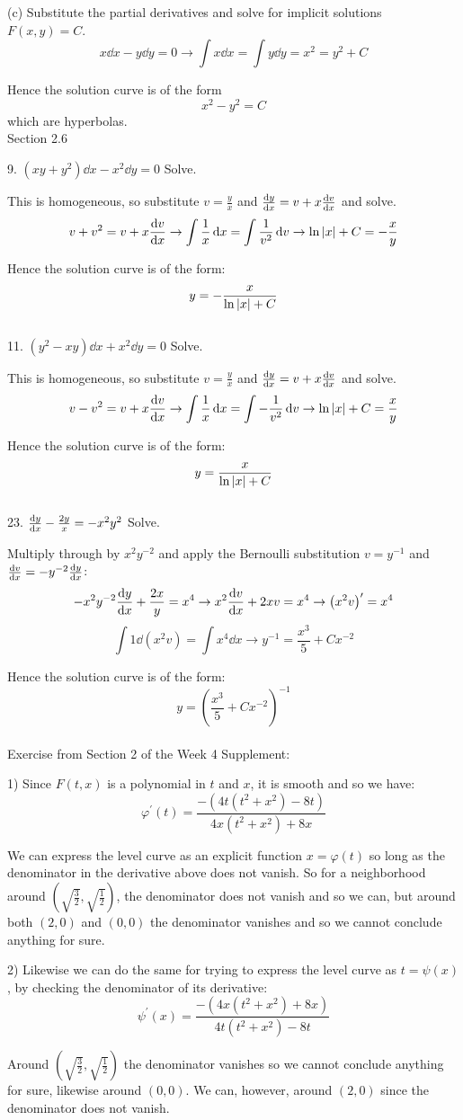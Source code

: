 \documentclass[11pt]{article}
\newcommand{\br}[1]{\left(#1\right)}
\begin{document}
(c) Substitute the partial derivatives and solve for implicit solutions $F(x,y) = C$.
$$x\dd{x} - y\dd{y} = 0 \to \int x\dd{x} = \int y\dd{y} = x^2 = y^2 + C$$

Hence the solution curve is of the form
$$x^2 - y^2 = C$$
which are hyperbolas. \\

Section 2.6

9. $\br{xy + y^2}\dd{x} - x^2\dd{y} = 0$ Solve.

This is homogeneous, so substitute $v = \frac{y}{x}$ and $\dv{y}{x} = v + x\dv{v}{x}$ and solve.
$$v + v^2  = v + x\dv{v}{x} \to \int \frac{1}{x}\dd{x} = \int \frac{1}{v^2}\dd{v} \to \ln\abs{x} + C = -\frac{x}{y}$$

Hence the solution curve is of the form:
$$y = -\frac{x}{\ln\abs{x} + C}$$ \\

11. $\br{y^2-xy}\dd{x} + x^2\dd{y} = 0$ Solve.

This is homogeneous, so substitute $v = \frac{y}{x}$ and $\dv{y}{x} = v + x\dv{v}{x}$ and solve.
$$v - v^2  = v + x\dv{v}{x} \to \int \frac{1}{x}\dd{x} = \int -\frac{1}{v^2}\dd{v} \to \ln\abs{x} + C = \frac{x}{y}$$

Hence the solution curve is of the form:
$$y = \frac{x}{\ln\abs{x} + C}$$ \\

23. $\dv{y}{x} - \frac{2y}{x} = -x^2y^2$ Solve.

Multiply through by $x^2y^{-2}$ and apply the Bernoulli substitution $v = y^{-1}$ and $\dv{v}{x} = -y^{-2}\dv{y}{x}$:
$$-x^2y^{-2}\dv{y}{x} + \frac{2x}{y} = x^4 \to x^2\dv{v}{x} + 2xv = x^4 \to \br{x^2v}^{\prime} = x^4$$
$$\int 1 \dd{\br{x^2v}} = \int x^4 \dd{x} \to y^{-1} = \frac{x^3}{5} + Cx^{-2}$$

Hence the solution curve is of the form:
$$y = \br{\frac{x^3}{5} + Cx^{-2}}^{-1}$$ \\

Exercise from Section 2 of the Week 4 Supplement:

1) Since $F(t,x)$ is a polynomial in $t$ and $x$, it is smooth and so we have:
$$\varphi^{\prime}(t) = \frac{-\br{4t\br{t^2+x^2}-8t}}{4x\br{t^2+x^2}+8x}$$

We can express the level curve as an explicit function $x = \varphi(t)$ so long as the denominator in the derivative above does not vanish. So for a neighborhood around $\br{\sqrt{\frac{3}{2}}, \sqrt{\frac{1}{2}}}$, the denominator does not vanish and so we can, but around both $\br{2,0}$ and $\br{0,0}$ the denominator vanishes and so we cannot conclude anything for sure.

2) Likewise we can do the same for trying to express the level curve as $t = \psi(x)$, by checking the denominator of its derivative:
$$\psi^{\prime}(x) = \frac{-\br{4x\br{t^2+x^2}+8x}}{4t\br{t^2+x^2}-8t}$$

Around $\br{\sqrt{\frac{3}{2}}, \sqrt{\frac{1}{2}}}$ the denominator vanishes so we cannot conclude anything for sure, likewise around $\br{0,0}$. We can, however, around $\br{2,0}$ since the denominator does not vanish.
\end{document}
